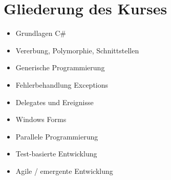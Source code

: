 \section{Gliederung des Kurses}
\begin{itemize}
\item Grundlagen C\#
\item Vererbung, Polymorphie, Schnittstellen
\item Generische Programmierung
\item Fehlerbehandlung Exceptions
\item Delegates und Ereignisse
\item Windows Forms
\item Parallele Programmierung
\item Test-basierte Entwicklung
\item Agile / emergente Entwicklung
\end{itemize}

\endinput
